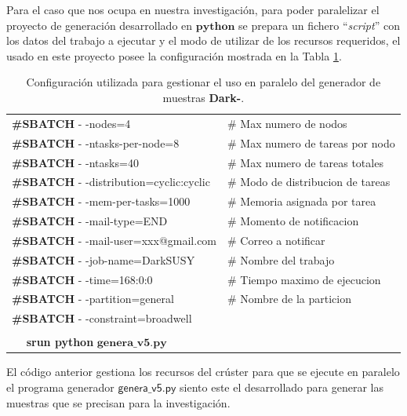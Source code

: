 Para el caso que nos ocupa en nuestra investigación, para poder paralelizar el proyecto de generación desarrollado en $\mathbf{python}$ se prepara un fichero ``\textit{script}'' con los datos del trabajo a ejecutar y el modo de utilizar de los recursos requeridos, el usado en este proyecto posee la configuración mostrada en la Tabla \ref{table_slurm}. %
\begin{table}[!t]
\begin{center}
\small
\begin{tabular}{|ll|}
\toprule
\textbf{\#SBATCH} - -nodes=4                    &\# Max numero de nodos\\
\textbf{\#SBATCH} - -ntasks-per-node=8          &\# Max numero de tareas por nodo\\
\textbf{\#SBATCH} - -ntasks=40                  &\# Max numero de tareas totales\\
\textbf{\#SBATCH} - -distribution=cyclic:cyclic &\# Modo de distribucion de tareas\\
\textbf{\#SBATCH} - -mem-per-tasks=1000         &\# Memoria asignada por tarea\\
\textbf{\#SBATCH} - -mail-type=END              &\# Momento de notificacion\\
\textbf{\#SBATCH} - -mail-user=xxx@gmail.com    &\# Correo a notificar\\
\textbf{\#SBATCH} - -job-name=DarkSUSY          &\# Nombre del trabajo\\
\textbf{\#SBATCH} - -time=168:0:0               &\# Tiempo maximo de ejecucion\\
\textbf{\#SBATCH} - -partition=general          &\# Nombre de la particion\\
\textbf{\#SBATCH} - -constraint=broadwell       & \\
& \\[-.3cm]
~~ \textbf{srun python} $\mathbf{genera\_v5.py}$ & \\
\bottomrule 
\end{tabular}
\caption{Configuración utilizada para gestionar el uso en paralelo del generador de muestras \textbf{Dark-}\SUSY.}
\label{table_slurm}
\end{center}
\end{table}
El código anterior gestiona los recursos del crúster para que se ejecute en paralelo el programa generador $\textsf{genera\_v5.py}$ siento este el desarrollado para generar las muestras que se precisan para la investigación.


















